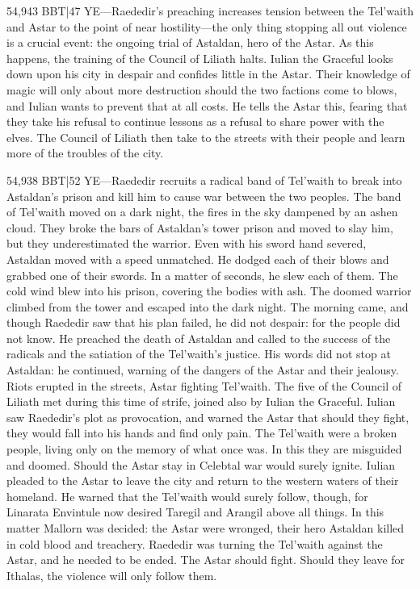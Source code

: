\documentclass[smalldemyvopaper,11pt,twoside,onecolumn,openright,extrafontsizes]{memoir}
\begin{document}
{{54,943 BBT|47 YE—Raededir’s preaching increases tension between the Tel’waith and Astar to the point of near hostility—the only thing stopping all out violence is a crucial event: the ongoing trial of Astaldan, hero of the Astar. As this happens, the training of the Council of Liliath halts. Iulian the Graceful looks down upon his city in despair and confides little in the Astar. Their knowledge of magic will only about more destruction should the two factions come to blows, and Iulian wants to prevent that at all costs. He tells the Astar this, fearing that they take his refusal to continue lessons as a refusal to share power with the elves. The Council of Liliath then take to the streets with their people and learn more of the troubles of the city.

54,938 BBT|52 YE—Raededir recruits a radical band of Tel’waith to break into Astaldan’s prison and kill him to cause war between the two peoples. The band of Tel’waith moved on a dark night, the fires in the sky dampened by an ashen cloud. They broke the bars of Astaldan’s tower prison and moved to slay him, but they underestimated the warrior. Even with his sword hand severed, Astaldan moved with a speed unmatched. He dodged each of their blows and grabbed one of their swords. In a matter of seconds, he slew each of them. The cold wind blew into his prison, covering the bodies with ash. The doomed warrior climbed from the tower and escaped into the dark night.
The morning came, and though Raededir saw that his plan failed, he did not despair: for the people did not know. He preached the death of Astaldan and called to the success of the radicals and the satiation of the Tel’waith’s justice. His words did not stop at Astaldan: he continued, warning of the dangers of the Astar and their jealousy. Riots erupted in the streets, Astar fighting Tel’waith.
The five of the Council of Liliath met during this time of strife, joined also by Iulian the Graceful. Iulian saw Raededir’s plot as provocation, and warned the Astar that should they fight, they would fall into his hands and find only pain. The Tel’waith were a broken people, living only on the memory of what once was. In this they are misguided and doomed. Should the Astar stay in Celebtal war would surely ignite. Iulian pleaded to the Astar to leave the city and return to the western waters of their homeland. He warned that the Tel’waith would surely follow, though, for Linarata Envintule now desired Taregil and Arangil above all things.
In this matter Mallorn was decided: the Astar were wronged, their hero Astaldan killed in cold blood and treachery. Raededir was turning the Tel’waith against the Astar, and he needed to be ended. The Astar should fight. Should they leave for Ithalas, the violence will only follow them.
}}
\end{document}
